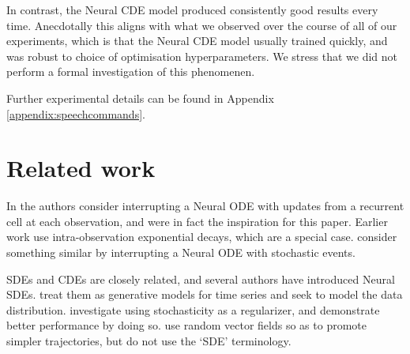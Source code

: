 \documentclass{article}
\theoremstyle{plain}
\theoremstyle{definition}
\begin{document}
	In contrast, the Neural CDE model produced consistently good results every time. Anecdotally this aligns with what we observed over the course of all of our experiments, which is that the Neural CDE model usually trained quickly, and was robust to choice of optimisation hyperparameters. We stress that we did not perform a formal investigation of this phenomenen.
	
%	
	
	
	Further experimental details can be found in Appendix \ref{appendix:speechcommands}.
	
	\section{Related work}
	In \cite{latent-odes, gru-ode-bayes} the authors consider interrupting a Neural ODE with updates from a recurrent cell at each observation, and were in fact the inspiration for this paper. Earlier work \cite{Che2018, BRITS, NeuralHawkes, discreteevent} use intra-observation exponential decays, which are a special case. \cite{njsde} consider something similar by interrupting a Neural ODE with stochastic events.
	
	SDEs and CDEs are closely related, and several authors have introduced Neural SDEs. \cite{josef, nsde-generative, stochasticDNF} treat them as generative models for time series and seek to model the data distribution. \cite{nsde-normalisation, stochasticnode} investigate using stochasticity as a regularizer, and demonstrate better performance by doing so. \cite{stochasticvectorfield} use random vector fields so as to promote simpler trajectories, but do not use the `SDE' terminology.
	
\end{document}
